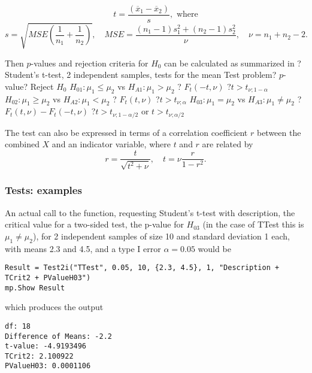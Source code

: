 \begin{equation}
	t= \frac{(\overline{x}_1-\overline{x}_2)}{s}, \text{ where}
\end{equation}
\begin{equation} \label{eq:TTest2i}
	s = \sqrt{\textit{MSE}\left(\frac{1}{n_1}+\frac{1}{n_2}\right)}, \quad \textit{MSE} = \frac{(n_1-1)s_1^2+(n_2-1)s_2^2}{\nu}, \quad \nu=n_1+n_2-2.
\end{equation}


\mpTableThreeColsThreeRows
{Then $p$-values and rejection criteria for $H_0$ can be calculated as summarized in ? Student's t-test, 2 independent samples, tests for the mean}
{Test problem? $p$-value? Reject $H_0$}
{$H_{01}: \mu_1 \leq \mu_2$ vs $H_{A1}: \mu_1 > \mu_2$ ? $F_t\left(-t, \nu\right)$ ?$t > t_{\nu;1-\alpha}$}
{$H_{02}: \mu_1 \geq \mu_2$ vs $H_{A2}: \mu_1 < \mu_2$ ? $F_t\left(t, \nu\right)$  ?$t > t_{\nu;\alpha}$}
{$H_{03}: \mu_1 = \mu_2$ vs $H_{A3}: \mu_1 \neq \mu_2$ ? $F_t\left(t, \nu\right)-F_t\left(-t, \nu\right)$ ?$t > t_{\nu;1-\alpha/2}$ or $t > t_{\nu;\alpha/2}$}



The test can also be expressed in terms of a correlation coefficient $r$ between the combined $X$ and an indicator variable, where $t$ and $r$ are related by
\begin{equation}
	r=\frac{t}{\sqrt{t^2+\nu}}, \quad t= \nu \frac{r}{1-r^2}.
\end{equation}





\subsubsection{Tests: examples}
An actual call to the function, requesting Student's t-test with description, the critical value for a two-sided test, the p-value for $H_{03}$ (in the case of \textsf{TTest} this is $\mu_1 \neq \mu_2$), for 2 independent samples of size 10 and standard deviation 1 each, with means 2.3 and 4.5, and a type I error $\alpha=0.05$ would be

\begin{lstlisting}
Result = Test2i("TTest", 0.05, 10, {2.3, 4.5}, 1, "Description + TCrit2 + PValueH03")
mp.Show Result
\end{lstlisting}
which produces the output

\begin{verbatim}
df: 18
Difference of Means: -2.2
t-value: -4.9193496
TCrit2: 2.100922
PValueH03: 0.0001106
\end{verbatim}




